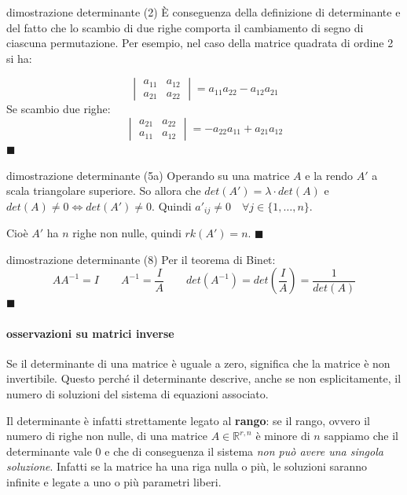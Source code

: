 \documentclass[x11names]{article}
\newcommand*{\QEDA}{\null\nobreak\hfill\ensuremath{\blacksquare}}%
\begin{document}
\begin{es}{dimostrazione determinante (2)}
È conseguenza della definizione di determinante e del fatto che lo scambio di due righe comporta il cambiamento di segno di ciascuna permutazione. Per esempio, nel caso della matrice quadrata di ordine 2 si ha:    

$$
\begin{vmatrix}
    a_{11} & a_{12} \\
    a_{21} & a_{22}
\end{vmatrix}
= a_{11}a_{22} - a_{12}a_{21}
$$
Se scambio due righe:
$$
\begin{vmatrix}
    a_{21} & a_{22} \\
    a_{11} & a_{12} 
\end{vmatrix}
= - a_{22}a_{11} + a_{21}a_{12}
$$
\QEDA
\end{es}
\begin{es}{dimostrazione determinante (5a)}
    Operando su una matrice $A$ e la rendo $A'$ a scala triangolare superiore. So allora che $det(A')=\lambda \cdot det(A)$ e $det(A) \neq 0 \Leftrightarrow det(A') \neq 0$.
    Quindi $a'_{ij} \neq 0 \quad \forall j \in \{1,\dots,n\}$.

    Cioè $A'$ ha $n$ righe non nulle, quindi $rk(A') = n$.
\QEDA
\end{es}
\begin{es}{dimostrazione determinante (8)} 
Per il teorema di Binet:
$$
AA^{-1} = I \qquad A^{-1} = \frac{I}{A} \qquad det(A^{-1}) = det(\frac{I}{A}) = \frac{1}{det(A)}
$$
\QEDA
\end{es}





\vspace{1em}
\noindent
\paragraph{osservazioni su matrici inverse}
Se il determinante di una matrice è uguale a zero, significa che la matrice è non invertibile. Questo perché il determinante descrive, anche se non esplicitamente, il numero di soluzioni del sistema di equazioni associato.

\noindent
Il determinante è infatti strettamente legato al \textbf{rango}: se il rango, ovvero il numero di righe non nulle, di una matrice $A \in \mathbb{R}^{r,n}$ è minore di $n$ sappiamo che il determinante vale $0$ e che di conseguenza il sistema\textit{ non può avere una singola soluzione}. Infatti se la matrice ha una riga nulla o più, le soluzioni saranno infinite e legate a uno o più parametri liberi.
\end{document}
